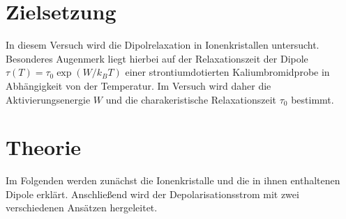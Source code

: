 \section{Zielsetzung}
\label{sec:Zielsetzung}
In diesem Versuch wird die Dipolrelaxation in Ionenkristallen untersucht. Besonderes Augenmerk liegt hierbei auf der Relaxationszeit der Dipole
$\tau(T)=\tau_0 \exp(W/k_BT)$ einer strontiumdotierten Kaliumbromidprobe in Abhängigkeit von der Temperatur.
Im Versuch wird daher die Aktivierungsenergie $W$ und die charakeristische Relaxationszeit $\tau_0$ bestimmt.

\section{Theorie}
\label{sec:Theorie}
 
Im Folgenden werden zunächst die Ionenkristalle und die in ihnen enthaltenen Dipole erklärt. Anschließend wird der 
Depolarisationsstrom mit zwei verschiedenen Ansätzen hergeleitet.

